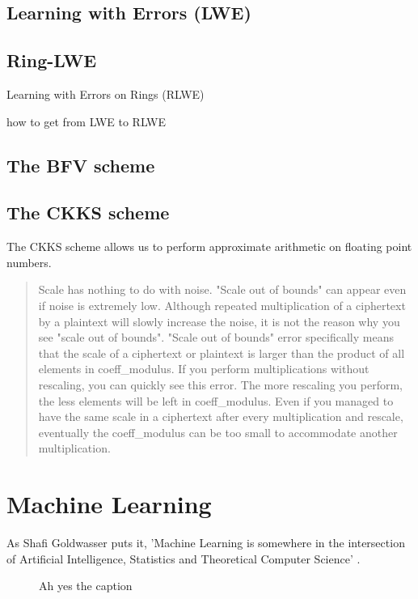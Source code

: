 \subsection{Learning with Errors (LWE)}

\subsection{Ring-LWE}
Learning with Errors on Rings (RLWE)

how to get from LWE to RLWE

\subsection{The BFV scheme}
\subsection{The CKKS scheme}
The CKKS scheme allows us to perform approximate arithmetic on floating point numbers.

\begin{quote}
  Scale has nothing to do with noise. "Scale out of bounds" can appear even if noise is extremely low. Although repeated multiplication of a ciphertext by a plaintext will slowly increase the noise, it is not the reason why you see "scale out of bounds".
  "Scale out of bounds" error specifically means that the scale of a ciphertext or plaintext is larger than the product of all elements in coeff_modulus. If you perform multiplications without rescaling, you can quickly see this error. The more rescaling you perform, the less elements will be left in coeff_modulus. Even if you managed to have the same scale in a ciphertext after every multiplication and rescale, eventually the coeff_modulus can be too small to accommodate another multiplication.
\end{quote}

\section{Machine Learning}
As Shafi Goldwasser puts it, 'Machine Learning is somewhere in the intersection of Artificial Intelligence, Statistics and Theoretical Computer Science' \cite{goldwasserTalk2018}.

\begin{figure}
  \centering
  \caption{Ah yes the caption}
\end{figure}

